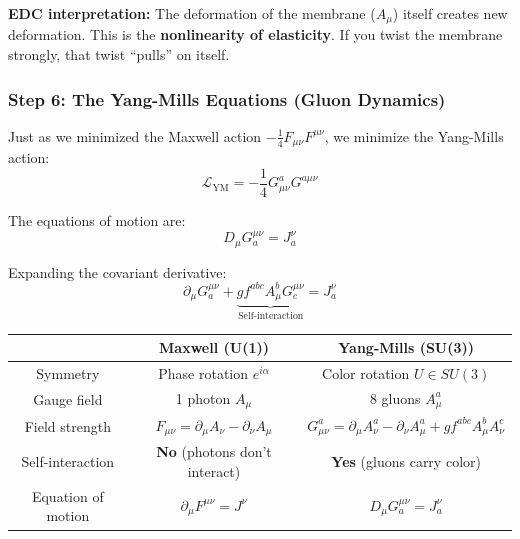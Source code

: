\textbf{EDC interpretation:} The deformation of the membrane ($A_\mu$) itself creates new deformation. This is the \textbf{nonlinearity of elasticity}. If you twist the membrane strongly, that twist ``pulls'' on itself.

\subsubsection{Step 6: The Yang-Mills Equations (Gluon Dynamics)}

Just as we minimized the Maxwell action $-\frac{1}{4}F_{\mu\nu}F^{\mu\nu}$, we minimize the Yang-Mills action:
\begin{equation}
\mathcal{L}_{\text{YM}} = -\frac{1}{4}G_{\mu\nu}^a G^{a\mu\nu}
\end{equation}

The equations of motion are:
\begin{equation}
\boxed{D_\mu G^{\mu\nu}_a = J^\nu_a}
\end{equation}

Expanding the covariant derivative:
\begin{equation}
\partial_\mu G^{\mu\nu}_a + \underbrace{g f^{abc} A_\mu^b G^{\mu\nu}_c}_{\text{Self-interaction}} = J^\nu_a
\end{equation}

\begin{tcolorbox}[colback=red!5,colframe=red!60!black,title=Comparison: Maxwell vs Yang-Mills]
\begin{center}
\begin{tabular}{|c|c|c|}
\hline
& \textbf{Maxwell (U(1))} & \textbf{Yang-Mills (SU(3))} \\
\hline
Symmetry & Phase rotation $e^{i\alpha}$ & Color rotation $U \in SU(3)$ \\
\hline
Gauge field & 1 photon $A_\mu$ & 8 gluons $A_\mu^a$ \\
\hline
Field strength & $F_{\mu\nu} = \partial_\mu A_\nu - \partial_\nu A_\mu$ & $G_{\mu\nu}^a = \partial_\mu A_\nu^a - \partial_\nu A_\mu^a + gf^{abc}A_\mu^b A_\nu^c$ \\
\hline
Self-interaction & \textbf{No} (photons don't interact) & \textbf{Yes} (gluons carry color) \\
\hline
Equation of motion & $\partial_\mu F^{\mu\nu} = J^\nu$ & $D_\mu G^{\mu\nu}_a = J^\nu_a$ \\
\hline
\end{tabular}
\end{center}
\end{tcolorbox}

